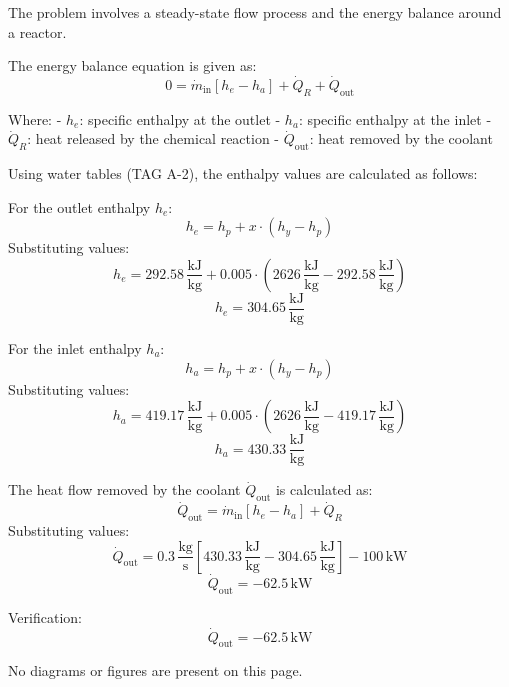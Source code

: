 The problem involves a steady-state flow process and the energy balance around a reactor.  

The energy balance equation is given as:  
\[
0 = \dot{m}_{\text{in}} \left[ h_e - h_a \right] + \dot{Q}_R + \dot{Q}_{\text{out}}
\]  

Where:  
- \( h_e \): specific enthalpy at the outlet  
- \( h_a \): specific enthalpy at the inlet  
- \( \dot{Q}_R \): heat released by the chemical reaction  
- \( \dot{Q}_{\text{out}} \): heat removed by the coolant  

Using water tables (TAG A-2), the enthalpy values are calculated as follows:  

For the outlet enthalpy \( h_e \):  
\[
h_e = h_p + x \cdot \left( h_y - h_p \right)
\]  
Substituting values:  
\[
h_e = 292.58 \, \frac{\text{kJ}}{\text{kg}} + 0.005 \cdot \left( 2626 \, \frac{\text{kJ}}{\text{kg}} - 292.58 \, \frac{\text{kJ}}{\text{kg}} \right)
\]  
\[
h_e = 304.65 \, \frac{\text{kJ}}{\text{kg}}
\]  

For the inlet enthalpy \( h_a \):  
\[
h_a = h_p + x \cdot \left( h_y - h_p \right)
\]  
Substituting values:  
\[
h_a = 419.17 \, \frac{\text{kJ}}{\text{kg}} + 0.005 \cdot \left( 2626 \, \frac{\text{kJ}}{\text{kg}} - 419.17 \, \frac{\text{kJ}}{\text{kg}} \right)
\]  
\[
h_a = 430.33 \, \frac{\text{kJ}}{\text{kg}}
\]  

The heat flow removed by the coolant \( \dot{Q}_{\text{out}} \) is calculated as:  
\[
\dot{Q}_{\text{out}} = \dot{m}_{\text{in}} \left[ h_e - h_a \right] + \dot{Q}_R
\]  
Substituting values:  
\[
\dot{Q}_{\text{out}} = 0.3 \, \frac{\text{kg}}{\text{s}} \left[ 430.33 \, \frac{\text{kJ}}{\text{kg}} - 304.65 \, \frac{\text{kJ}}{\text{kg}} \right] - 100 \, \text{kW}
\]  
\[
\dot{Q}_{\text{out}} = -62.5 \, \text{kW}
\]  

Verification:  
\[
\dot{Q}_{\text{out}} = -62.5 \, \text{kW}
\]  

No diagrams or figures are present on this page.